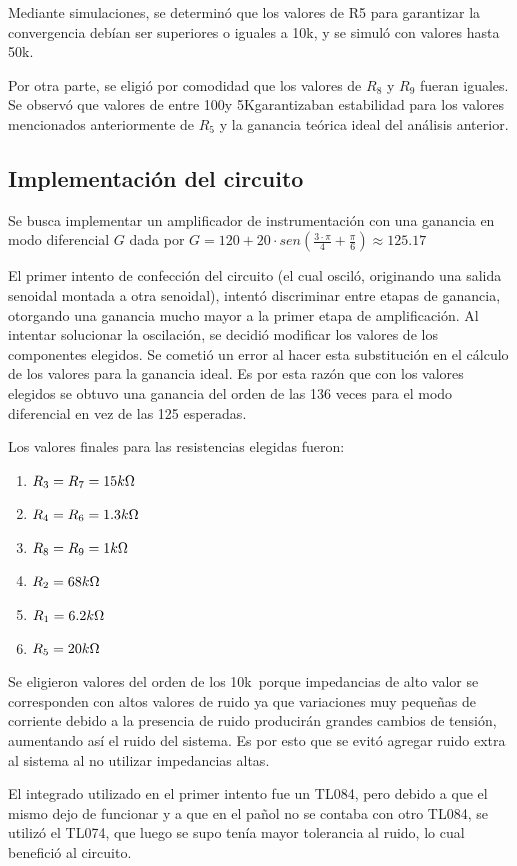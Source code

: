 \documentclass[../../tc_tp3_main.tex]{subfiles}
\begin{document}
Mediante simulaciones, se determinó que los valores de R5 para garantizar la convergencia debían ser superiores o iguales a 10k\ohm, y se simuló con valores hasta 50k\ohm.\par
Por otra parte, se eligió por comodidad que los valores de $R_8$ y $R_9$ fueran iguales. Se observó que valores de entre 100\ohm y 5K\ohm garantizaban estabilidad para los valores mencionados anteriormente de $R_5$ y la ganancia teórica ideal del análisis anterior.\par


\subsection{Implementación del circuito}

Se busca implementar un amplificador de instrumentación con una ganancia en modo diferencial $G$ dada por 
$G = 120 + 20\cdot sen(\frac{3\cdot\pi}{4}+\frac{\pi}{6}) \approx 125.17$\par

El primer intento de confección del circuito (el cual osciló, originando una salida senoidal montada a otra senoidal), intentó discriminar entre etapas de ganancia, otorgando una ganancia mucho mayor a la primer etapa de amplificación. Al intentar solucionar la oscilación, se decidió modificar los valores de los componentes elegidos. Se cometió un error al hacer esta substitución en el cálculo de los valores para la ganancia ideal. Es por esta razón que con los valores elegidos se obtuvo una ganancia del orden de las 136 veces para el modo diferencial en vez de las 125 esperadas. \par

Los valores finales para las resistencias elegidas fueron:\par

\begin{enumerate}
	\item $R_3 = R_7 = 15k\ohm$
	\item $R_4 = R_6 = 1.3k\ohm$
	\item $R_8 = R_9 = 1k\ohm$
	\item $R_2 = 68k\ohm$
	\item $R_1 = 6.2k\ohm$
	\item $R_5 = 20k\ohm$ 
\end{enumerate}

Se eligieron valores del orden de los 10k\ohm\, porque impedancias de alto valor se corresponden con altos valores de ruido ya que variaciones muy pequeñas de corriente debido a la presencia de ruido producirán grandes cambios de tensión, aumentando así el ruido del sistema. Es por esto que se evitó agregar ruido extra al sistema al no utilizar impedancias altas.\par
El integrado utilizado en el primer intento fue un TL084, pero debido a que el mismo dejo de funcionar y a que en el pañol no se contaba con otro TL084, se utilizó el TL074, que luego se supo tenía mayor tolerancia al ruido, lo cual benefició al circuito.
\end{document}

